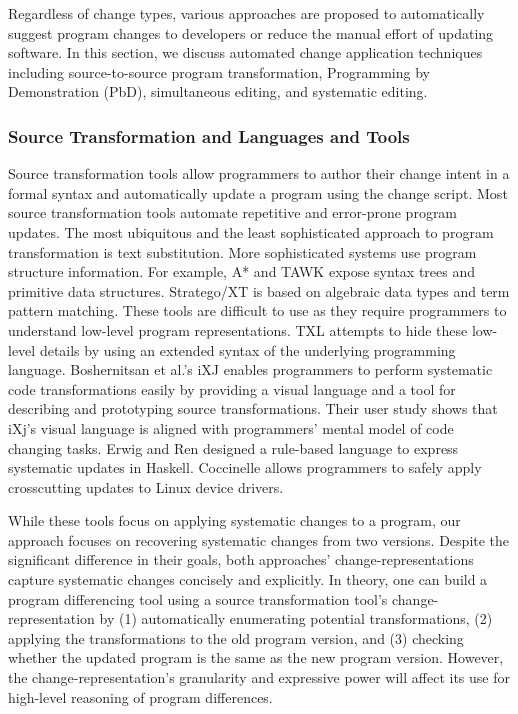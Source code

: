 \documentclass[runningheads,a4paper]{llncs}
\begin{document}
Regardless of change types, various approaches are proposed to automatically suggest program changes to developers or reduce the manual effort of updating software. In this section, we discuss automated change application techniques including source-to-source program transformation, Programming by Demonstration (PbD), simultaneous editing, and systematic editing.

\subsubsection{Source Transformation and Languages and Tools} 

Source transformation tools allow programmers to author their change intent in a formal syntax and automatically update a program using the change script. Most source transformation tools automate repetitive and error-prone program updates. The most ubiquitous and the least sophisticated approach to program transformation is text substitution. More sophisticated systems use program structure information. For example, A* \cite{Ladd1995} and TAWK \cite{Griswold1996} expose syntax trees and primitive data structures. Stratego/XT\cite{Visser2004} is based on algebraic data types and term pattern matching. These tools are difficult to use as they require programmers to understand low-level program representations. TXL \cite{Cordy2006} attempts to hide these low-level details by using an extended syntax of the underlying programming language. Boshernitsan et al.'s iXJ \cite{Boshernitsan2007} enables programmers to perform systematic code transformations easily by providing a visual language and a tool for describing and prototyping source transformations. Their user study shows that iXj's visual language is aligned with programmers' mental model of code changing tasks. Erwig and Ren \cite{Erwig2002} designed a rule-based language to express systematic updates in Haskell. Coccinelle \cite{Padioleau2008} allows programmers to safely apply crosscutting updates to Linux device drivers. 

While these tools focus on applying systematic changes to a program, our approach focuses on recovering systematic changes from two versions. 
Despite the significant difference in their goals, both approaches' change-representations capture systematic changes concisely and explicitly. In theory, one can build a program differencing tool using a source transformation tool's change-representation by (1) automatically enumerating potential transformations, (2) applying the transformations to the old program version, and (3) checking whether the updated program is the same as the new program version. 
However, the change-representation's granularity and expressive power will affect its use for high-level reasoning of program differences. 
\end{document}
